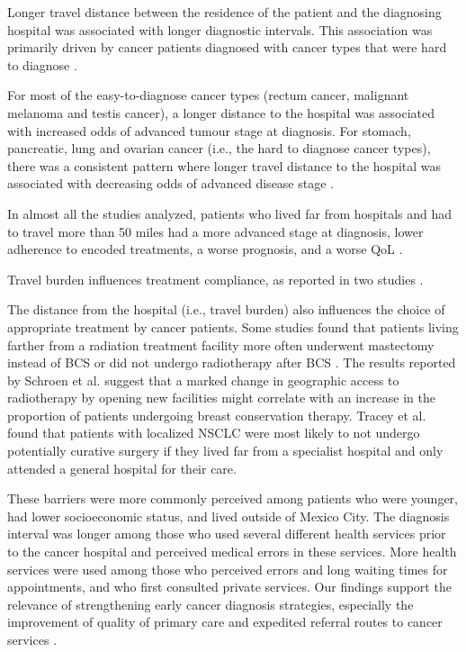 Longer travel distance between the residence of the patient and the diagnosing hospital was associated with longer diagnostic intervals. This association was primarily driven by cancer patients diagnosed with cancer types that were hard to diagnose \cite{flytkjaer_virgilsen_cancer_2019}.

For most of the easy-to-diagnose cancer types (rectum cancer, malignant melanoma and testis cancer), a longer distance to the hospital was associated with increased odds of advanced tumour stage at diagnosis. For stomach, pancreatic, lung and ovarian cancer (i.e., the hard to diagnose cancer types), there was a consistent pattern where longer travel distance to the hospital was associated with decreasing odds of advanced disease stage \cite{virgilsen_travel_2019}.

In almost all the studies analyzed, patients who lived far from hospitals and had to travel more than 50 miles had a more advanced stage at diagnosis, lower adherence to encoded treatments, a worse prognosis, and a worse QoL \cite{ambroggi_distance_2015}.

Travel burden influences treatment compliance, as reported in two studies
\cite{dutta_evaluation_2013,guidry_transportation_1997}.

The distance from the hospital (i.e., travel burden) also influences the choice of appropriate treatment by cancer patients. Some studies found that patients living farther from a radiation treatment facility more often underwent mastectomy instead of BCS \cite{schroen_impact_2005,celaya_travel_2006,voti_treatment_2006,meden_relationship_2002,nattinger_relationship_2001,boscoe_geographic_2011} or did not undergo radiotherapy after BCS \cite{satasivam_dilemma_2014,schroen_impact_2005,celaya_travel_2006}. The results reported by Schroen et al. \cite{schroen_impact_2005} suggest that a marked change in geographic access to radiotherapy by opening new facilities might correlate with an increase in the proportion of patients undergoing breast conservation therapy. Tracey et al. \cite{tracey_patients_2015} found that patients with localized NSCLC were most likely to not undergo potentially curative surgery if they lived far from a specialist hospital and only attended a general hospital for their care.

These barriers were more commonly perceived among patients who were younger, had lower socioeconomic status, and lived outside of Mexico City. The diagnosis interval was longer among those who used several different health services prior to the cancer hospital and perceived medical errors in these services. More health services were used among those who perceived errors and long waiting times for appointments, and who first consulted private services. Our findings support the relevance of strengthening early cancer diagnosis strategies, especially the improvement of quality of primary care and expedited referral routes to cancer services \cite{unger-saldana_barriers_2018}.


